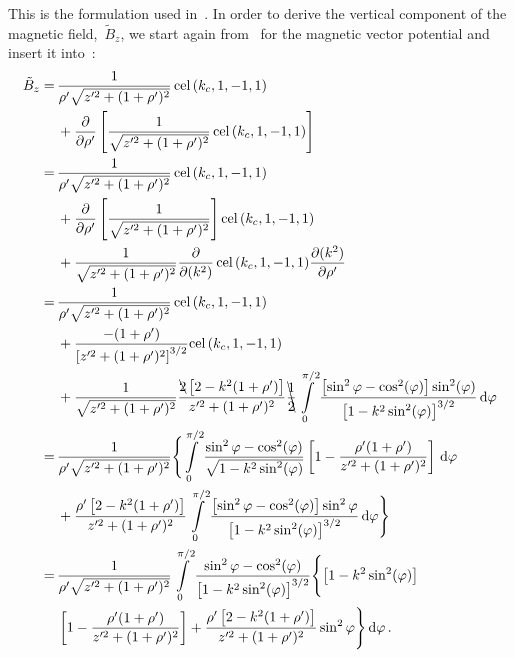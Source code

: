 This is the formulation used in~.
In order to derive the vertical component of the magnetic field,~$\tilde{B}_z$,
we start again from~ for the magnetic vector potential
and insert it into~:
\begin{align}
 \tilde{B}_z
 =&\,   \frac{1}{\rho' \sqrt{z'^2 + (1 + \rho')^2}} \,\textrm{cel}\,(k_c, 1, -1, 1) \nonumber \\
 ~&\, + \frac{\partial}{\partial \rho'} \left[ \frac{1}{\sqrt{z'^2 + (1 + \rho')^2}} \,\textrm{cel}\,(k_c, 1, -1, 1) \right] \nonumber \\
 =&\,   \frac{1}{\rho' \sqrt{z'^2 + (1 + \rho')^2}} \,\textrm{cel}\,(k_c, 1, -1, 1) \nonumber \\
 ~&\, + \frac{\partial}{\partial \rho'} \left[ \frac{1}{\sqrt{z'^2 + (1 + \rho')^2}} \right] \textrm{cel}\,(k_c, 1, -1, 1) \nonumber \\
 ~&\, + \frac{1}{\sqrt{z'^2 + (1 + \rho')^2}} \frac{\partial}{\partial (k^2)} \,\textrm{cel}\,(k_c, 1, -1, 1) \frac{\partial (k^2)}{\partial \rho'} \nonumber \\
 =&\,   \frac{1}{\rho' \sqrt{z'^2 + (1 + \rho')^2}} \,\textrm{cel}\,(k_c, 1, -1, 1) \nonumber \\
 ~&\, + \frac{-(1 + \rho')}{\left[z'^2 + (1 + \rho')^2\right]^{3/2}} \textrm{cel}\,(k_c, 1, -1, 1) \nonumber \\
 ~&\, + \frac{1}{\sqrt{z'^2 + (1 + \rho')^2}}
          \frac{\bcancel{2} \left[2 - k^2(1+\rho')\right]}{z'^2 + (1 + \rho')^2}
          \bcancel{\frac{1}{2}} \int\limits_0^{\pi/2} \frac{\left[\sin^2{\varphi} - \cos^2(\varphi)\right]\sin^2(\varphi)}{\left[1 - k^2 \sin^2(\varphi)\right]^{3/2}} \,\mathrm{d}\varphi \nonumber \\
 =&\, \frac{1}{\rho' \sqrt{z'^2 + (1 + \rho')^2}} \Biggl\{
        \int\limits_0^{\pi/2}
          \frac{\sin^2{\varphi} - \cos^2(\varphi)}{\sqrt{1 - k^2 \sin^2(\varphi)}}
          \left[1 - \frac{\rho'(1 + \rho')}{z'^2 + (1 + \rho')^2} \right] \,\mathrm{d}\varphi \nonumber \\
 ~&\, + \frac{\rho'\left[2 - k^2(1+\rho')\right]}{z'^2 + (1 + \rho')^2}
        \int\limits_0^{\pi/2}
          \frac{\left[\sin^2{\varphi} - \cos^2(\varphi)\right]\sin^2{\varphi}}{\left[1 - k^2 \sin^2(\varphi)\right]^{3/2}} \,\mathrm{d}\varphi \Biggr\} \nonumber \\
 =&\, \frac{1}{\rho' \sqrt{z'^2 + (1 + \rho')^2}}
      \int\limits_0^{\pi/2}
        \frac{\sin^2{\varphi} - \cos^2(\varphi)}{\left[1 - k^2 \sin^2(\varphi)\right]^{3/2}} \Biggl\{ \left[1 - k^2 \sin^2(\varphi)\right] \nonumber \\
 ~&\,        \left[1 - \frac{\rho'(1 + \rho')}{z'^2 + (1 + \rho')^2} \right]
          + \frac{\rho'\left[2 - k^2(1+\rho')\right]}{z'^2 + (1 + \rho')^2} \sin^2{\varphi} \Biggr\} \,\mathrm{d}\varphi \, . \label{eqn:cwl_B_z_halfway}
\end{align}
